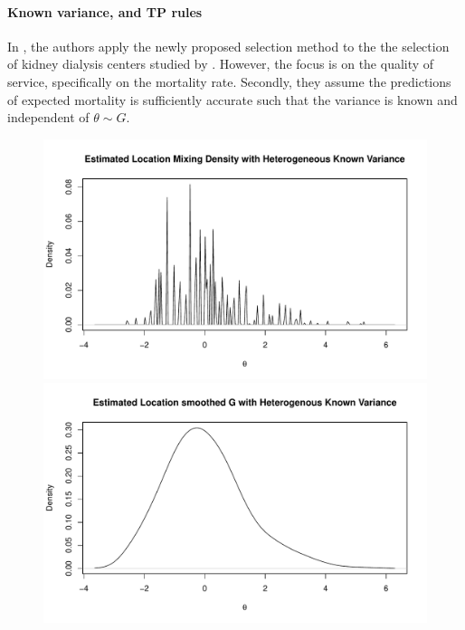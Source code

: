 \documentclass[12pt]{article}
\begin{document}
\paragraph{Known variance, and TP rules} In \citet{gu2023invidious}, the authors
apply the newly proposed selection method to the the selection of kidney
dialysis centers studied by \citep{lin2006loss,lin2009ranking}. However, the
focus is on the quality of service, specifically on the mortality rate.
Secondly, they assume the predictions of expected mortality is sufficiently
accurate such that the variance is known and independent of $\theta\sim G$.

\begin{figure}[h!]
    \centering
    \begin{minipage}{0.5\textwidth}
        \centering
        \includegraphics[width=\textwidth]{../../Figures/2013-2022/GMM_m/GLmix.pdf}
    \end{minipage}\hfill
    \begin{minipage}{0.5\textwidth}
        \centering
        \includegraphics[width=\textwidth]{../../Figures/2013-2022/GMM_m/GLmix_s.pdf}
    \end{minipage}
\end{figure}
\end{document}
